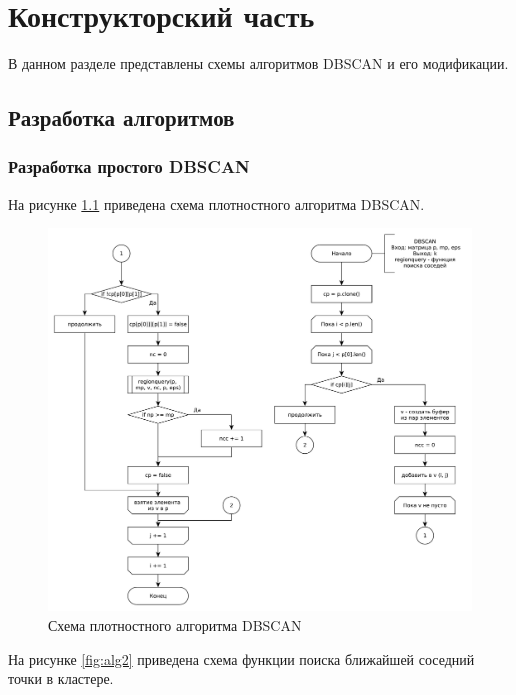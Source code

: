 \chapter{Конструкторский часть}

В данном разделе представлены схемы алгоритмов DBSCAN и его модификации.

\section{Разработка алгоритмов} %

\subsection{Разработка простого DBSCAN}
 
На рисунке \ref{fig:alg} приведена схема плотностного алгоритма DBSCAN.

\begin{figure}[ht!]
	\centering
	\includegraphics[width=1\linewidth]{assets/graphs/dbscan.pdf}
	\caption{Схема плотностного алгоритма DBSCAN}
	\label{fig:alg}
\end{figure}

На рисунке \ref{fig:alg2} приведена схема функции поиска ближайшей соседний точки в кластере.

